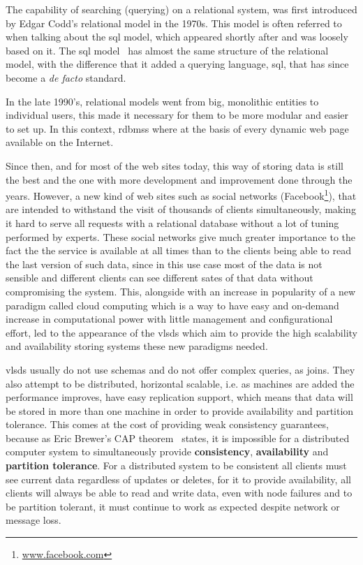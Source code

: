 The capability of searching (querying) on a relational system, was first introduced by Edgar Codd's relational model \cite{codd1970relational} in the 1970s. This model is often referred to when talking about the \ac{sql} model, which appeared shortly after and was loosely based on it. The \ac{sql} model~\cite{Chamberlin:1974:SSE:800296.811515} has almost the same structure of the relational model, with the difference that it added a querying language, \ac{sql}, that has since become a \emph{de facto} standard.

In the late 1990's, relational models went from big, monolithic entities to individual users, this made it necessary for them to be more modular and easier to set up. In this context, \acp{rdbms} where at the basis of every dynamic web page available on the Internet. 

Since then, and for most of the web sites today, this way of storing data is still the best and the one with more development and improvement done through the years. However, a new kind of web sites such as social networks (Facebook\footnote{\url{www.facebook.com}}), that are intended to withstand the visit of thousands of clients simultaneously, making it hard to serve all requests with a relational database without a lot of tuning performed by experts. These social networks give much greater importance to the fact the the service is available at all times than to the clients being able to read the last version of such data, since in this use case most of the data is not sensible and different clients can see different sates of that data without compromising the system. This, alongside with an increase in popularity of a new paradigm called cloud computing which is a way to have easy and on-demand increase in computational power with little management and configurational effort, led to the appearance of the \acp{vlsd} which aim to provide the high scalability and availability storing systems these new paradigms needed. 

\acp{vlsd} usually do not use schemas and do not offer complex queries, as joins. They also attempt to be distributed, horizontal scalable, i.e. as machines are added the performance improves, have easy replication support, which means that data will be stored in more than one machine in order to provide availability and partition tolerance. This comes at the cost of providing weak consistency guarantees, because as Eric Brewer's CAP theorem~\cite{Brewer2000} states, it is impossible for a distributed computer system to simultaneously provide \textbf{consistency}, \textbf{availability} and \textbf{partition tolerance}. For a distributed system to be consistent all clients must see current data regardless of updates or deletes, for it to provide availability, all clients will always be able to read and write data, even with node failures and to be partition tolerant, it must continue to work as expected despite network or message loss.

